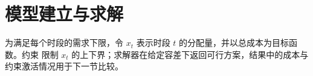\section{模型建立与求解}
为满足每个时段的需求下限，令 $x_t$ 表示时段 $t$ 的分配量，并以总成本为目标函数。约束
限制 $x_t$ 的上下界；求解器在给定容差下返回可行方案，结果中的成本与约束激活情况用于下一节比较。
